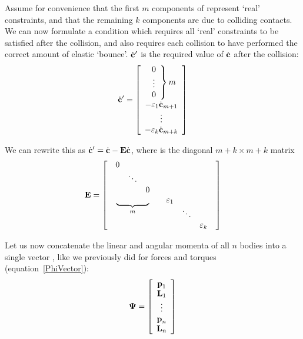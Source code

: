 Assume for convenience that the first $m$ components of  represent `real' constraints, and
that the remaining $k$ components are due to colliding contacts. We can now formulate a condition
which requires all `real' constraints to be satisfied after the collision, and also requires each
collision to have performed the correct amount of elastic `bounce'. $\dot{\ve{c}}'$ is the
required value of $\dot{\ve{c}}$ after the collision:
\begin{equation}
\dot{\ve{c}}' = \left[\begin{array}[m]{c}
    \left. \begin{array}{c} 0 \\\vdots\\ 0 \end{array} \right\} m \\
    -\varepsilon_1 \dot{\ve{c}}_{m+1} \\\vdots\\
    -\varepsilon_k \dot{\ve{c}}_{m+k}
    \end{array}\right]
\end{equation}

We can rewrite this as $\dot{\ve{c}}' = \dot{\ve{c}} - \m{E}\dot{\ve{c}}$, where  is the
diagonal $m+k \times m+k$ matrix
\begin{equation}
\m{E} = \left[ \begin{array}{cc}
    \begin{array}{ccc} 0 \\ & \ddots \\ && 0 \end{array} \\
    \underbrace{\quad\quad\quad\quad}_m &
    \begin{array}[t]{ccc} \varepsilon_1 \\ & \ddots \\ && \varepsilon_k \end{array}
    \end{array} \right]
\end{equation}

Let us now concatenate the linear and angular momenta of all $n$ bodies into a single vector
\ve{\Psi}, like we previously did for forces and torques (equation~\ref{PhiVector}):
\begin{equation} \label{PsiVector}
\ve{\Psi} = \left[\begin{array}{c}
    \ve{p}_1 \\ \ve{L}_1 \\ \vdots \\ \ve{p}_n \\ \ve{L}_n \end{array}\right]
\end{equation}

